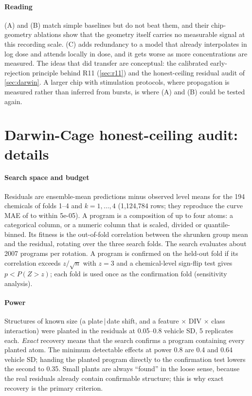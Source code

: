 \documentclass[11pt,a4paper]{article}
\newcommand{\file}[1]{\texttt{\detokenize{#1}}}
\begin{document}
\paragraph{Reading}
(A) and (B) match simple baselines but do not beat them, and their chip-geometry ablations show that the
geometry itself carries no measurable signal at this recording scale. (C) adds redundancy to a model that
already interpolates in log dose and attends locally in dose, and it gets worse as more concentrations are
measured. The ideas that did transfer are conceptual: the calibrated early-rejection principle behind R11
(\cref{sec:r11}) and the honest-ceiling residual audit of \cref{sec:darwin}. A larger chip with stimulation
protocols, where propagation is measured rather than inferred from bursts, is where (A) and (B) could be
tested again.

\section{Darwin-Cage honest-ceiling audit: details}\label{app:darwin}

\paragraph{Search space and budget}
Residuals are ensemble-mean predictions minus observed level means for the
194 chemicals of folds 1--4 and \(k=1,\dots,4\) (1,124,784 rows; they reproduce
the curve MAE of \file{trajectory_cv.json} to within 5e-05). A program is a
composition of up to four atoms: a categorical column, or a numeric column that is scaled, divided or quantile-binned.
Its fitness is the out-of-fold correlation between the shrunken group mean and the residual, rotating over the three
search folds. The search evaluates about 2007 programs per rotation. A program is confirmed on the
held-out fold if its correlation exceeds \(z/\sqrt{n}\) with \(z=3\) and a chemical-level sign-flip test gives
\(p<P(Z>z)\); each fold is used once as the confirmation fold (sensitivity analysis).

\paragraph{Power}
Structures of known size (a plate\,|\,date shift, and a feature \(\times\) DIV \(\times\) class interaction) were planted
in the residuals at 0.05--0.8 vehicle SD, 5 replicates each. \emph{Exact} recovery means that the search confirms
a program containing every planted atom. The minimum detectable effects at power 0.8 are
0.4 and
0.64 vehicle SD; handing the planted
program directly to the confirmation test lowers the second to
0.35. Small plants are always ``found''
in the loose sense, because the real residuals already contain confirmable structure; this is why exact recovery is
the primary criterion.
\end{document}
